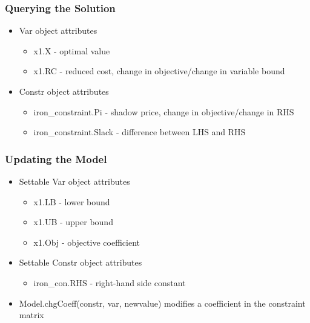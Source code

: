 \documentclass[12pt,handout]{beamer}
\begin{document}
\begin{frame}
\frametitle{Querying the Solution}
\begin{itemize}
\item Var object attributes
    \begin{itemize}
    \item x1.X - optimal value
    \item x1.RC - reduced cost, change in objective/change in variable bound
    \end{itemize}
\item Constr object attributes
    \begin{itemize}
    \item iron\_constraint.Pi - shadow price, change in objective/change in RHS
    \item iron\_constraint.Slack - difference between LHS and RHS
    \end{itemize}
\end{itemize}
\end{frame}

\begin{frame}
\frametitle{Updating the Model}
\begin{itemize}
\item Settable Var object attributes
    \begin{itemize}
    \item x1.LB - lower bound
    \item x1.UB - upper bound
    \item x1.Obj - objective coefficient
    \end{itemize}
\item Settable Constr object attributes
    \begin{itemize}
    \item iron\_con.RHS - right-hand side constant
    \end{itemize}
\item Model.chgCoeff(constr, var, newvalue) modifies a coefficient in the constraint matrix
\end{itemize}
\end{frame}
\end{document}
